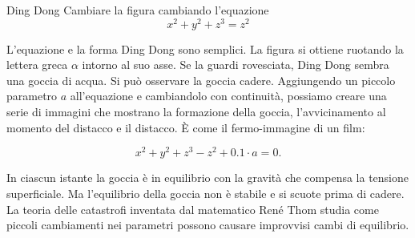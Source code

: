 \begin{surferPage}{Ding Dong}
Cambiare la figura cambiando l'equazione\\

\smallskip
\[x^2	+ y^2	+ z^3	= z^2\]

\singlespacing
L'equazione e la forma Ding Dong sono semplici. La figura si ottiene ruotando la lettera greca $\alpha$ intorno al suo asse. Se la guardi rovesciata, Ding Dong sembra una goccia di acqua. Si pu\`o osservare la goccia cadere.
\newline
Aggiungendo un piccolo parametro $a$ all'equazione e cambiandolo con continuit\`a, possiamo creare una serie di immagini che mostrano la formazione della goccia, l'avvicinamento al momento del distacco e il distacco. \`E come il fermo-immagine di un film:

\[x^2	+ y^2	+ z^3	-z^2+0.1\cdot a=0.\]

In ciascun istante la goccia \`e in equilibrio con la gravit\`a che compensa la tensione superficiale. Ma l'equilibrio della goccia non \`e stabile e si scuote prima di cadere. La teoria delle catastrofi inventata dal matematico Ren\'e Thom studia come piccoli cambiamenti nei parametri possono causare improvvisi cambi di equilibrio.
\end{surferPage}
